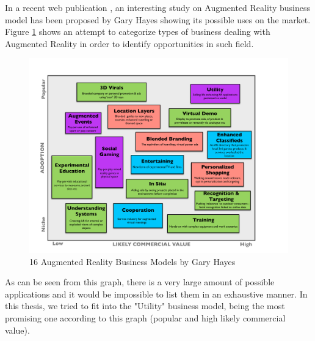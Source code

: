 In a recent web publication \cite{Hay09}, an interesting study on Augmented Reality business model has been proposed by Gary Hayes showing its possible uses on the market. Figure \ref{fig:AR_business_model} shows an attempt to categorize types of business dealing with Augmented Reality in order to identify opportunities in such field.\\

\begin{figure}[ht]
\center
\includegraphics[scale=0.4]{pics/AR_business_model}
\caption{16 Augmented Reality Business Models by Gary Hayes \cite{Hay09}}
\label{fig:AR_business_model}
\end{figure}

As can be seen from this graph, there is a very large amount of possible applications and it would be impossible to list them in an exhaustive manner. In this thesis, we tried to fit into the "Utility" business model, being the most promising one according to this graph (popular and high likely commercial value).